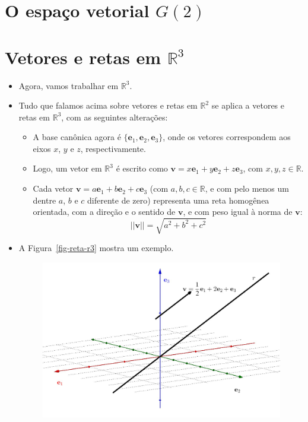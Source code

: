 \documentclass[
  letterpaper,
  DIV=11,
  numbers=noendperiod]{scrreprt}
\begin{document}
\hypertarget{o-espauxe7o-vetorial-g2}{%
\section{\texorpdfstring{O espaço vetorial
$G(2)$}{O espaço vetorial }}\label{o-espauxe7o-vetorial-g2}}

\hypertarget{vetores-e-retas-em-mathbbr3}{%
\section{\texorpdfstring{Vetores e retas em
$\mathbb{R}^3$}{Vetores e retas em }}\label{vetores-e-retas-em-mathbbr3}}

\begin{itemize}
\item
  Agora, vamos trabalhar em $\mathbb{R}^3$.
\item
  Tudo que falamos acima sobre vetores e retas em $\mathbb{R}^2$ se
  aplica a vetores e retas em $\mathbb{R}^3$, com as seguintes
  alterações:

  \begin{itemize}
  \item
    A base canônica agora é
    $\{ \mathbf{e}_{1}, \mathbf{e}_{2}, \mathbf{e}_{3} \}$, onde os
    vetores correspondem aos eixos $x$, $y$ e $z$, respectivamente.
  \item
    Logo, um vetor em $\mathbb{R}^3$ é escrito como
    $\mathbf{v} = x\mathbf{e}_{1} + y\mathbf{e}_{2} + z\mathbf{e}_{3}$,
    com $x, y, z \in \mathbb{R}$.
  \item
    Cada vetor
    $\mathbf{v} = a\mathbf{e}_{1} + b\mathbf{e}_{2} + c\mathbf{e}_{3}$
    (com $a, b, c \in \mathbb{R}$, e com pelo menos um dentre $a$, $b$ e
    $c$ diferente de zero) representa uma reta homogênea orientada, com
    a direção e o sentido de $\mathbf{v}$, e com peso igual à norma de
    $\mathbf{v}$: \[
    ||\mathbf{v}|| = \sqrt{a^2 + b^2 + c^2}
    \]
  \end{itemize}
\item
  A Figura~\ref{fig-reta-r3} mostra um exemplo.

  \begin{figure}[htb]

  {\centering \includegraphics[width=1\textwidth,height=\textheight]{figures/reta-r3.png}

}
\end{figure}
\end{itemize}
\end{document}
